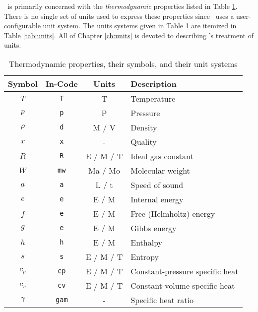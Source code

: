 \PM\ is primarily concerned with the \emph{thermodynamic} properties listed in Table \ref{tab:properties}.  There is no single set of units used to express these properties since \PM\ uses a user-configurable unit system.  The units systems given in Table \ref{tab:properties} are itemized in Table \ref{tab:units}.  All of Chapter \ref{ch:units} is devoted to describing \PM's treatment of units.

\begin{table}
\centering
\caption{Thermodynamic properties, their symbols, and their unit systems}\label{tab:properties}
\begin{tabular}{|cccl|}
\hline
Symbol & In-Code & Units & Description\\
\hline
$T$ & \verb|T| & T & Temperature\\
$p$ & \verb|p| & P & Pressure\\
$\rho$ & \verb|d| & M / V & Density\\
$x$ & \verb|x| & - & Quality\\
\hline
$R$ & \verb|R| & E / M / T & Ideal gas constant\\
$W$ & \verb|mw| & Ma / Mo & Molecular weight\\
\hline
$a$ & \verb|a| & L / t & Speed of sound\\
$e$ & \verb|e| & E / M & Internal energy\\
$f$ & \verb|e| & E / M & Free (Helmholtz) energy\\
$g$ & \verb|e| & E / M & Gibbs energy\\
$h$ & \verb|h| & E / M & Enthalpy\\
$s$ & \verb|s| & E / M / T & Entropy\\
\hline
$c_p$ & \verb|cp| & E / M / T & Constant-pressure specific heat\\
$c_v$ & \verb|cv| & E / M / T & Constant-volume specific heat\\
$\gamma$ & \verb|gam| & - & Specific heat ratio\\
\hline
\end{tabular}
\end{table}


